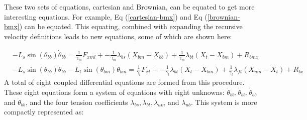 \documentclass[
11pt, %
english, %
singlespacing, %
headsepline, %
chapterinoneline, %
]{MastersDoctoralThesis} %
\begin{document}
These two sets of equations, cartesian and Brownian, can be equated to get more interesting equations. For example, Eq (\ref{cartesian-bmx}) and Eq (\ref{brownian-bmx}) can be equated. This equating, combined with expanding the recursive velocity definitions leads to new equations, some of which are shown here:

\begin{align}
  &-L_s\sin(\theta_{bb})\dot{\theta}_{bb} = \frac{1}{\gamma_m}F_{xml} + -\frac{1}{\gamma_m}\lambda_{bs}(X_{bm} - X_{bb}) + \frac{1}{\gamma_m}\lambda_{bt}(X_{t } - X_{bm}) + R_{bmx} \label{ob_system_first}\\
  &-L_s\sin(\theta_{bb})\dot{\theta}_{bb} - L_t\sin(\theta_{bm})\dot{\theta}_{bm} = \frac{1}{\gamma_t}F_{xt } + -\frac{1}{\gamma_t}\lambda_{bt}(X_{t } - X_{bm}) + \frac{1}{\gamma_t}\lambda_{ft}(X_{um} - X_{t }) + R_{tx}\label{ob_system_second}
\end{align}
%
A total of eight coupled differential equations are formed from this procedure. These eight equations form a system of equations with eight unknowns: $\dot{\theta}_{bb}, \dot{\theta}_{bb}, \dot{\theta}_{bb}$ and $\dot{\theta}_{bb}$, and the four tension coefficients $\lambda_{bs}, \lambda_{bt}, \lambda_{um}$ and $\lambda_{ub}$. This system is more compactly represented as:
\end{document}
